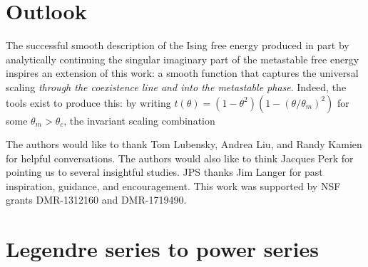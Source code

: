 \documentclass[
  aps,
  pre,
  preprint,
  longbibliography,
  floatfix
]{revtex4-2}
\begin{document}
\section{Outlook}

The successful smooth description of the Ising free energy produced in part by analytically continuing the singular imaginary part of the metastable free energy inspires an extension of this work: a smooth function that captures the universal scaling \emph{through the coexistence line and into the metastable phase}. Indeed, the tools exist to produce this: by writing $t(\theta)=(1-\theta^2)(1-(\theta/\theta_m)^2)$ for some $\theta_m>\theta_c$, the invariant scaling combination

\begin{acknowledgments}
  The authors would like to thank Tom Lubensky, Andrea Liu, and Randy Kamien
  for helpful conversations. The authors would also like to think Jacques Perk
  for pointing us to several insightful studies. JPS thanks Jim Langer for past
  inspiration, guidance, and encouragement. This work was supported by NSF
  grants DMR-1312160 and DMR-1719490.
\end{acknowledgments}



\appendix

\section{Legendre series to power series}
\end{document}
